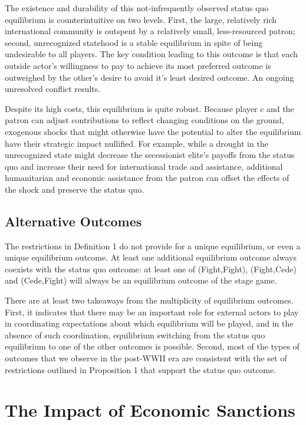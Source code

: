 The existence and durability of this not-infrequently observed status quo equilibrium is counterintuitive on two levels. First, the large, relatively rich international community is outspent by a relatively small, less-resourced patron; second, unrecognized statehood is a stable equilibrium in spite of being undesirable to all players. The key condition leading to this outcome is that each outside actor's willingness to pay to achieve its most preferred outcome is outweighed by the other's desire to avoid it's least desired outcome. An ongoing unresolved conflict results.

Despite its high costs, this equilibrium is quite robust. Because player $c$ and the patron can adjust contributions to reflect changing conditions on the ground, exogenous shocks that might otherwise have the potential to alter the equilibrium have their strategic impact nullified. For example, while a drought in the unrecognized state might decrease the secessionist elite's payoffs from the status quo and increase their need for international trade and assistance, additional humanitarian and economic assistance from the patron can offset the effects of the shock and preserve the status quo.

\subsection{Alternative Outcomes}
\label{sec:alt}

The restrictions in Definition 1 do not provide for a unique equilibrium, or even a unique equilibrium outcome. At least one additional equilibrium outcome always coexists with the status quo outcome: at least one of (Fight,Fight), (Fight,Cede) and (Cede,Fight) will always be an equilibrium outcome of the stage game.

There are at least two takeaways from the multiplicity of equilibrium outcomes. First, it indicates that there may be an important role for external actors to play in coordinating expectations about which equilibrium will be played, and in the absence of such coordination, equilibrium switching from the status quo equilibrium to one of the other outcomes is possible. Second, most of the types of outcomes that we observe in the post-WWII era are consistent with the set of restrictions outlined in Proposition 1 that support the status quo outcome. 

\section{The Impact of Economic Sanctions}
\label{sec:sanctions}

